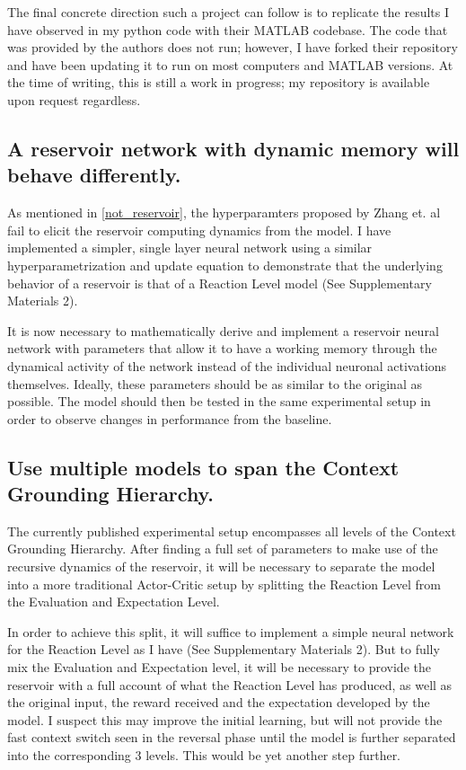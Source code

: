 \documentclass[11pt]{article}
\begin{document}
The final concrete direction such a project can follow is to replicate the results I have observed in my python code with their MATLAB codebase.  The code that was provided by the authors does not run; however, I have forked their repository and have been updating it to run on most computers and MATLAB versions.  At the time of writing, this is still a work in progress; my repository is available upon request regardless.

\subsection{A reservoir network with dynamic memory will behave differently.}
As mentioned in \autoref{not_reservoir}, the hyperparamters proposed by Zhang et. al fail to elicit the reservoir computing dynamics from the model.  I have implemented a simpler, single layer neural network using a similar hyperparametrization and update equation to demonstrate that the underlying behavior of a reservoir is that of a Reaction Level model (See Supplementary Materials 2).

It is now necessary to mathematically derive and implement a reservoir neural network with parameters that allow it to have a working memory through the dynamical activity of the network instead of the individual neuronal activations themselves.  Ideally, these parameters should be as similar to the original as possible.  The model should then be tested in the same experimental setup in order to observe changes in performance from the baseline.

\subsection{Use multiple models to span the Context Grounding Hierarchy.}
The currently published experimental setup encompasses all levels of the Context Grounding Hierarchy.  After finding a full set of parameters to make use of the recursive dynamics of the reservoir, it will be necessary to separate the model into a more traditional Actor-Critic setup by splitting the Reaction Level from the Evaluation and Expectation Level.

In order to achieve this split, it will suffice to implement a simple neural network for the Reaction Level as I have (See Supplementary Materials 2).  But to fully mix the Evaluation and Expectation level, it will be necessary to provide the reservoir with a full account of what the Reaction Level has produced, as well as the original input, the reward received and the expectation developed by the model.  I suspect this may improve the initial learning, but will not provide the fast context switch seen in the reversal phase until the model is further separated into the corresponding 3 levels.  This would be yet another step further.
\end{document}
